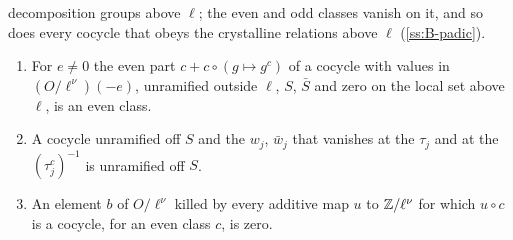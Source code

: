 decomposition groups above $\ell$; the even and odd classes vanish on it, and so does every cocycle that obeys the crystalline relations above $\ell$ (\cref{ss:B-padic}).

\begin{lemma}\label{lem:even-parts}
\begin{enumerate}[label=\textup{(\alph*)}]
\item For $e\ne0$ the even part $c+c\circ(g\mapsto g^c)$ of a cocycle with values in $(O/\ell^\nu)(-e)$, unramified outside $\ell$, $S$, $\bar S$ and zero on the local set above $\ell$, is an even class.
\item A cocycle unramified off $S$ and the $w_j$, $\bar w_j$ that vanishes at the $\tau_j$ and at the $(\tau_j^c)^{-1}$ is unramified off $S$.
\item An element $b$ of $O/\ell^\nu$ killed by every additive map $u$ to $\mathbb{Z}/\ell^\nu$ for which $u\circ c$ is a cocycle, for an even class $c$, is zero.
\end{enumerate}
\end{lemma}

